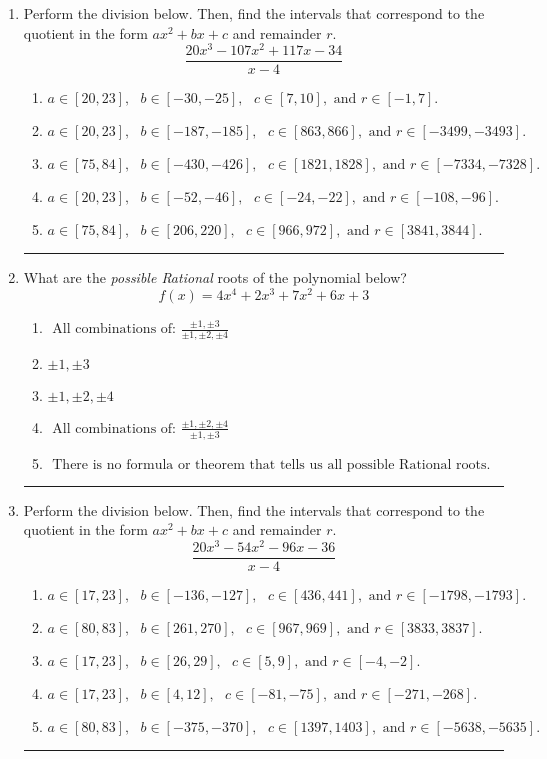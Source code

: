 \documentclass[14pt]{extbook}
\newcommand{\litem}[1]{\item#1\hspace*{-1cm}\rule{\textwidth}{0.4pt}}
\begin{document}
\begin{enumerate}
{\begin{enumerate}[label=\Alph*.]
\end{enumerate} }
\litem{
Perform the division below. Then, find the intervals that correspond to the quotient in the form $ax^2+bx+c$ and remainder $r$.\[ \frac{20x^{3} -107 x^{2} +117 x -34}{x -4} \]\begin{enumerate}[label=\Alph*.]
\item \( a \in [20, 23], \text{   } b \in [-30, -25], \text{   } c \in [7, 10], \text{   and   } r \in [-1, 7]. \)
\item \( a \in [20, 23], \text{   } b \in [-187, -185], \text{   } c \in [863, 866], \text{   and   } r \in [-3499, -3493]. \)
\item \( a \in [75, 84], \text{   } b \in [-430, -426], \text{   } c \in [1821, 1828], \text{   and   } r \in [-7334, -7328]. \)
\item \( a \in [20, 23], \text{   } b \in [-52, -46], \text{   } c \in [-24, -22], \text{   and   } r \in [-108, -96]. \)
\item \( a \in [75, 84], \text{   } b \in [206, 220], \text{   } c \in [966, 972], \text{   and   } r \in [3841, 3844]. \)

\end{enumerate} }
\litem{
What are the \textit{possible Rational} roots of the polynomial below?\[ f(x) = 4x^{4} +2 x^{3} +7 x^{2} +6 x + 3 \]\begin{enumerate}[label=\Alph*.]
\item \( \text{ All combinations of: }\frac{\pm 1,\pm 3}{\pm 1,\pm 2,\pm 4} \)
\item \( \pm 1,\pm 3 \)
\item \( \pm 1,\pm 2,\pm 4 \)
\item \( \text{ All combinations of: }\frac{\pm 1,\pm 2,\pm 4}{\pm 1,\pm 3} \)
\item \( \text{ There is no formula or theorem that tells us all possible Rational roots.} \)

\end{enumerate} }
\litem{
Perform the division below. Then, find the intervals that correspond to the quotient in the form $ax^2+bx+c$ and remainder $r$.\[ \frac{20x^{3} -54 x^{2} -96 x -36}{x -4} \]\begin{enumerate}[label=\Alph*.]
\item \( a \in [17, 23], \text{   } b \in [-136, -127], \text{   } c \in [436, 441], \text{   and   } r \in [-1798, -1793]. \)
\item \( a \in [80, 83], \text{   } b \in [261, 270], \text{   } c \in [967, 969], \text{   and   } r \in [3833, 3837]. \)
\item \( a \in [17, 23], \text{   } b \in [26, 29], \text{   } c \in [5, 9], \text{   and   } r \in [-4, -2]. \)
\item \( a \in [17, 23], \text{   } b \in [4, 12], \text{   } c \in [-81, -75], \text{   and   } r \in [-271, -268]. \)
\item \( a \in [80, 83], \text{   } b \in [-375, -370], \text{   } c \in [1397, 1403], \text{   and   } r \in [-5638, -5635]. \)


\end{enumerate}}
\end{enumerate}
\end{document}

